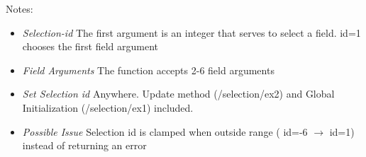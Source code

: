 {Notes}:
\begin{itemize}[noitemsep]
\item \textit{Selection-id} The first argument is an integer that serves to select a field. \ie{} id=1 chooses the first field argument
\item \textit{Field Arguments} The function accepts 2-6 field arguments
\item \textit{Set Selection id}  Anywhere. Update method (\exs{}/selection/ex2) and  Global Initialization (\exs{}/selection/ex1) included.
\item \textit{Possible Issue} Selection id is clamped when outside range (\ie{} id=-6 $\rightarrow$ id=1)  instead of returning an error
\end{itemize}